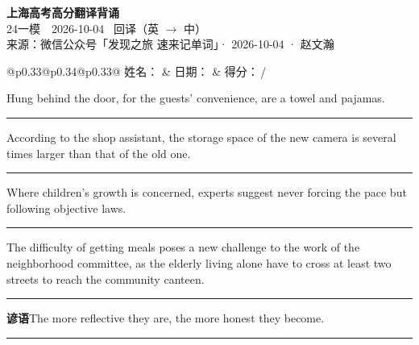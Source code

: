 \documentclass[11pt,a4paper]{article}
\newcommand{\num}[1]{\makebox[1.9em][r]{#1.}\hspace{0.3em}}
\newcommand{\wline}{\noindent\rule{\linewidth}{0.4pt}}
\begin{document}
\pagestyle{plain}
\begin{center}
{\LARGE\bfseries 上海高考高分翻译背诵 }\\[0.25em]
{\large 24一模　2026-10-04 \quad\ 回译（英 $\to$ 中）}\\[0.35em]
{\footnotesize 来源：微信公众号「发现之旅 速来记单词」· 2026-10-04 · 赵文瀚}
\end{center}

\vspace{0.4em}
\noindent\begin{tabular}{@{}p{0.33\textwidth}@{}p{0.34\textwidth}@{}p{0.33\textwidth}@{}}
姓名：\underline{\hspace{2.0cm}} & 日期：\underline{\hspace{2.0cm}} & 得分：\underline{\hspace{1.4cm}}\,/ \\
\end{tabular}

\vspace{0.5em}

\vspace{0.8em}
\num{1}Hung behind the door, for the guests’ convenience, are a towel and pajamas.

\vspace{0.25em}

\wline

\num{2}According to the shop assistant, the storage space of the new camera is several times larger than that of the old one.

\vspace{0.25em}

\wline

\num{3}Where children’s growth is concerned, experts suggest never forcing the pace but following objective laws.

\vspace{0.25em}

\wline

\num{4}The difficulty of getting meals poses a new challenge to the work of the neighborhood committee, as the elderly living alone have to cross at least two streets to reach the community canteen.

\vspace{0.25em}

\wline

\vspace{0.4em}\noindent{\color{rulegray}\rule{\textwidth}{0.6pt}}\vspace{0.4em}

\num{5}\textbf{谚语}\quad The more reflective they are, the more honest they become.

\vspace{0.25em}

\wline
\end{document}
